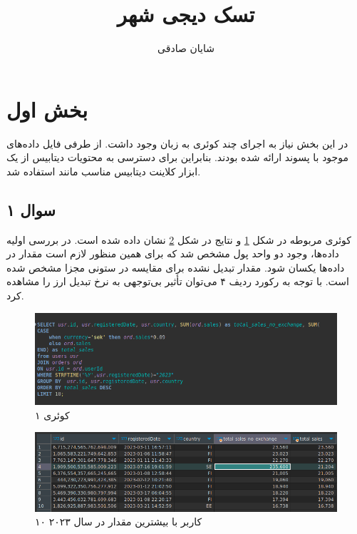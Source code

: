 \documentclass[a4paper,12pt,fullpage]{article}
\title{تسک دیجی شهر}
\author{شایان صادقی}
\begin{document}
	
	\maketitle
	\pagebreak
	
	
	\section{بخش اول}
	در این بخش نیاز به اجرای چند کوئری به زبان  وجود داشت. از طرفی فایل داده‌های موجود با پسوند  ارائه شده بودند. بنابراین برای دسترسی به محتویات دیتابیس  از یک ابزار کلاینت دیتابیس مناسب مانند  استفاده شد.
	
	\subsection{سوال ۱}
	کوئری مربوطه در شکل \ref{fig1_1} و نتایج در شکل \ref{fig1_1_res} نشان داده شده است. در بررسی اولیه داده‌ها، وجود دو واحد پول مشخص شد که برای همین منظور لازم است مقدار  در داده‌ها یکسان شود. مقدار تبدیل نشده برای مقایسه در ستونی مجزا مشخص شده است. با توجه به رکورد ردیف ۴ می‌توان تأثیر بی‌توجهی به نرخ تبدیل ارز را مشاهده کرد.
	
	\begin{figure}[hbt!]
		\includegraphics[width=\linewidth]{"./images/q1.1.png"}
			\caption{کوئری ۱}
		\label{fig1_1}
	
	\end{figure}

\begin{figure}[hbt!]
	\includegraphics[width=\linewidth]{"./images/q1.1_res.png"}	
	\caption{۱۰ کاربر با بیشترین مقدار  در سال ۲۰۲۳}
	\label{fig1_1_res}
	
\end{figure}
\end{document}
